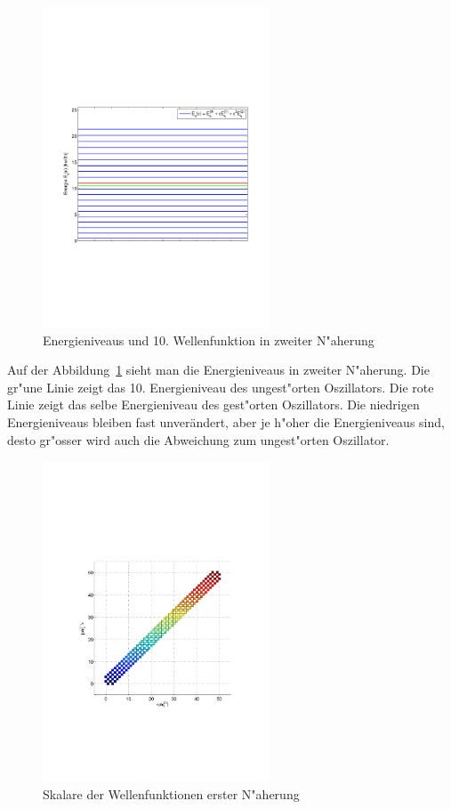 \begin{refsection}
\begin{figure}[h]	%
\centering
\includegraphics[width=0.6\textwidth]{anharmonisch/images/x3/Energie(2Stoerung_0135).pdf}
\caption{Energieniveaus und 10. Wellenfunktion in zweiter N"aherung
\label{skript:x3_Energie(2Stoerung_0135)}}
\end{figure}

Auf der Abbildung~\ref{skript:x3_Energie(2Stoerung_0135)} sieht man die Energieniveaus in zweiter N"aherung. Die gr"une Linie zeigt das 10. Energieniveau des ungest"orten Oszillators. Die rote Linie zeigt das selbe Energieniveau des gest"orten Oszillators. Die niedrigen Energieniveaus bleiben fast unverändert, aber je h"oher die Energieniveaus sind, desto gr"osser wird auch die Abweichung zum ungest"orten Oszillator. 

\begin{figure}[h]	%
\centering
\includegraphics[width=0.6\textwidth]{anharmonisch/images/x3/PLK11.pdf}
\caption{Skalare der Wellenfunktionen erster N"aherung
\label{skript:x3_PLK11}}
\end{figure}


\end{refsection}
